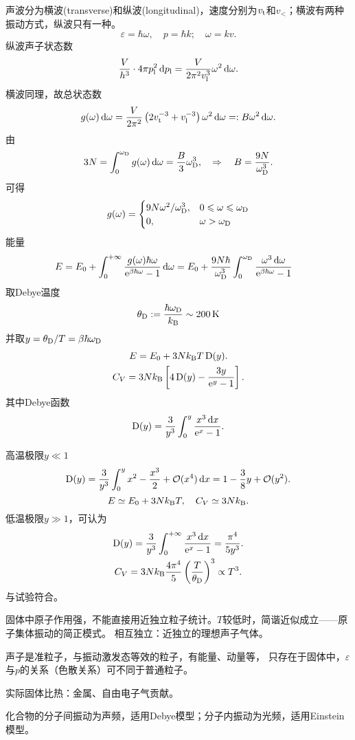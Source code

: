 声波分为横波(transverse)和纵波(longitudinal)，速度分别为$v_\mathrm t$和$v_\lt$；横波有两种振动方式，纵波只有一种。
\[
	\varepsilon=\hbar\omega,\quad p=\hbar k;\quad \omega=kv.
\]
纵波声子状态数
\[
	\frac V{h^3}\cdot 4\pi p_\mathrm l^2\mathop{}\!\mathrm{d} p_\mathrm l=\frac V{2\pi^2v_\mathrm l^3}\omega^2\mathop{}\!\mathrm{d}\omega.
\]
横波同理，故总状态数
\[
	g(\omega)\mathop{}\!\mathrm{d}\omega=\frac V{2\pi^2}\left(2v_\mathrm t^{-3}+v_\mathrm l^{-3}\right)\omega^2\mathop{}\!\mathrm{d}\omega=:B\omega^2\mathop{}\!\mathrm{d}\omega.
\]
由
\[
	3	N=\int_0^{\omega_\mathrm D}g(\omega)\mathop{}\!\mathrm{d}\omega=\frac B3\omega_\mathrm D^3,\quad\Rightarrow\quad B=\frac{9N}{\omega_\mathrm D^3}.
\]
可得
\begin{align*}
	g(\omega)=\begin{cases}
		9N\omega^2/\omega_\mathrm D^3,&0\leqslant\omega\leqslant\omega_\mathrm D\\
		0,&\omega>\omega_\mathrm D
	\end{cases}
\end{align*}
能量 
\begin{align*}
	E&=E_0+\int_0^{+\infty}\frac{ g(\omega)\hbar\omega}{\mathop{}\!\mathrm{e}^{\beta\hbar\omega}-1}\mathop{}\!\mathrm{d}\omega=E_0+\frac{9N\hbar}{\omega_\mathrm D^3}\int_0^{\omega_\mathrm D}\frac{\omega^3\mathop{}\!\mathrm{d}\omega}{\mathop{}\!\mathrm{e}^{\beta\hbar\omega}-1}
\end{align*}
取Debye温度
\[
	\theta_\Db:=\frac{\hbar\omega_\Db}\kB\sim\SI{200}\K
\]
并取$y=\theta_\mathrm D/T=\beta\hbar\omega_\mathrm D$
\begin{gather}
	E=E_0+3Nk_{\mathrm B} T\operatorname{D}(y).\\
	C_V=3Nk_{\mathrm B}\left[4\operatorname{D}(y)-\frac{3y}{\mathop{}\!\mathrm{e}^{y}-1}\right].
\end{gather}
其中Debye函数
\[
	\operatorname{D}(y)=\frac 3{y^3}\int_0^{y}\frac{x^3\mathop{}\!\mathrm{d} x}{\mathop{}\!\mathrm{e}^ x-1}.
\]

高温极限$y\ll 1$
\begin{align*}
	\operatorname{D}(y)=\frac3{y^3}\int_0^yx^2-\frac{x^3}2+\mathcal O(x^4)\mathop{}\!\mathrm{d} x=1-\frac38y+\mathcal O(y^2).
\end{align*}
\[
	E\simeq E_0+3Nk_{\mathrm B} T,\quad C_V\simeq 3Nk_{\mathrm B}.
\]
低温极限$y\gg 1$，可认为
\begin{gather}\notag
	\operatorname{D}(y)=\frac3{y^3}\int_0^{+\infty}\frac{x^3\mathop{}\!\mathrm{d} x}{\mathop{}\!\mathrm{e}^ x-1}=\frac{\pi^4}{5y^3}.\\
	C_V=3Nk_{\mathrm B}\frac{4\pi^4}5\left(\frac T{\theta_\mathrm D}\right)^3\propto T^3.\label{CV-Debye}
\end{gather}
与试验符合。
\begin{compactenum}
	\item 固体中原子作用强，不能直接用近独立粒子统计。$T$较低时，简谐近似成立——原子集体振动的简正模式。
	相互独立：近独立的理想声子气体。
	\item 声子是准粒子，与振动激发态等效的粒子，有能量、动量等，
	只存在于固体中，$\varepsilon$与$p$的关系（色散关系）可不同于普通粒子。
	\item 实际固体比热：金属、自由电子气贡献。

	化合物的分子间振动为声频，适用Debye模型；分子内振动为光频，适用Einstein模型。
\end{compactenum}
